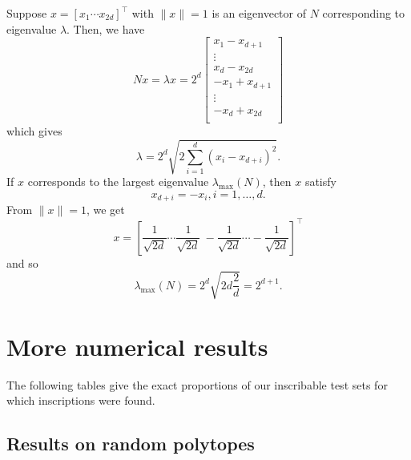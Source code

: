 \documentclass[smallextended, envcountsame]{svjour3}
\begin{document}
Suppose $x=[x_1\cdots x_{2d}]^\top$ with $\|x\|=1$ is an eigenvector of $N$ corresponding to eigenvalue $\lambda$.  Then, we have
\begin{equation*}
    Nx = \lambda x = 2^d\begin{bmatrix}
        x_1-x_{d+1}\\
        \vdots\\
        x_d-x_{2d}\\
        -x_1+x_{d+1}\\
        \vdots\\
        -x_d+x_{2d}\\
    \end{bmatrix}
\end{equation*}
which gives
\begin{equation*}
    \lambda = 2^d\sqrt{2\sum\limits_{i=1}^d\left(x_i-x_{d+i}\right)^2}.
\end{equation*}
If $x$ corresponds to the largest eigenvalue $\lambda_{\max}(N)$, then $x$ satisfy
\begin{equation*}
    x_{d+i} = -x_i,i=1,\ldots,d.
\end{equation*}
From $\|x\|=1$, we get
\begin{equation*}
    x = \left[\frac{1}{\sqrt{2d}}\cdots\frac{1}{\sqrt{2d}}~-\frac{1}{\sqrt{2d}}\cdots -\frac{1}{\sqrt{2d}}\right]^\top
\end{equation*}
and so
\begin{equation*}
    \lambda_{\max}(N) = 2^d\sqrt{2d\frac{2}{d}} = 2^{d+1}.
\end{equation*}

\section{More numerical results}\label{app:morenumres}
The following tables give the exact proportions of our inscribable test sets for which inscriptions were found.

\subsection{Results on random polytopes}~
\end{document}
